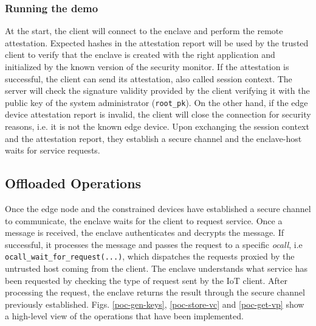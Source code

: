 \subsubsection{Running the demo}
At the start, the client will connect to the enclave and perform the remote attestation. Expected hashes in the attestation report will be used by the trusted client to verify that the enclave is created with the right application and initialized by the known version of the security monitor. If the attestation is successful, the client can send its attestation, also called session context. The server will check the signature validity provided by the client verifying it with the public key of the system administrator (\texttt{root\_pk}). On the other hand, if the edge device attestation report is invalid, the client will close the connection for security reasons, i.e. it is not the known edge device.
Upon exchanging the session context and the attestation report, they establish a secure channel and the enclave-host waits for service requests.

\subsection{Offloaded Operations}
Once the edge node and the constrained devices have established a secure channel to communicate, the enclave waits for the client to request service. Once a message is received, the enclave authenticates and decrypts the message. 
If successful, it processes the message and passes the request to a specific \textit{ocall}, i.e \texttt{ocall\_wait\_for\_request(...)}, which dispatches the requests proxied by the untrusted host coming from the client. 
The enclave understands what service has been requested by checking the type of request sent by the IoT client.
After processing the request, the enclave returns the result through the secure channel previously established. Figs. \ref{poc-gen-keys}, \ref{poc-store-vc} and \ref{poc-get-vp} show a high-level view of the operations that have been implemented. 

